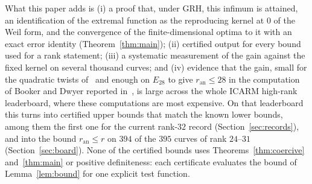 \documentclass[11pt]{amsart}
\theoremstyle{remark}
\theoremstyle{definition}
\newcommand{\ran}{r_{\mathrm{an}}}
\begin{document}
What this paper adds is (i) a proof that, under GRH, this infimum is attained, an identification of the extremal function as the reproducing kernel at $0$ of the Weil form, and the convergence of the finite-dimensional optima to it with an exact error identity (Theorem~\ref{thm:main}); (ii) certified output for every bound used for a rank statement; (iii) a systematic measurement of the gain against the fixed kernel on several thousand curves; and (iv) evidence that the gain, small for the quadratic twists of~\cite{Watkins} and enough on $E_{28}$ to give $\ran\le28$ in the computation of Booker and Dwyer reported in~\cite{Bober}, is large across the whole ICARM high-rank leaderboard, where these computations are most expensive. On that leaderboard this turns into certified upper bounds that match the known lower bounds, among them the first one for the current rank-$32$ record (Section~\ref{sec:records}), and into the bound $\ran\le r$ on $394$ of the $395$ curves of rank $24$--$31$ (Section~\ref{sec:board}). None of the certified bounds uses Theorems~\ref{thm:coercive} and~\ref{thm:main} or positive definiteness: each certificate evaluates the bound of Lemma~\ref{lem:bound} for one explicit test function.
\end{document}
